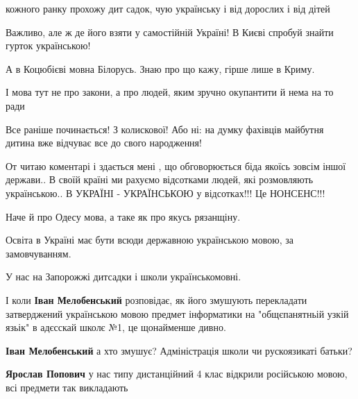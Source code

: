 \begin{itemize}
кожного ранку прохожу дит садок, чую українську і від дорослих і від дітей


Важливо, але ж де його взяти у самостійній Україні! В Києві спробуй знайти
гурток українською!

А в Коцюбієві мовна Білорусь. Знаю про що кажу, гірше лише в Криму.

І мова тут не про закони, а про людей, яким зручно окупантити й нема на то ради

Все раніше починається! З колискової! Або ні: на думку фахівців майбутня дитина
вже відчуває все до свого народження!


От читаю коментарі і здається мені , що обговорюється біда якоїсь зовсім іншої
держави.. В своїй країні ми рахуємо відсотками людей, які розмовляють
українською.. В УКРАЇНІ - УКРАЇНСЬКОЮ у відсотках!!! Це НОНСЕНС!!!


Наче й про Одесу мова, а таке як про якусь рязанщіну.

Освіта в Україні має бути всюди державною українською мовою, за замовчуванням.

У нас на Запорожжі дитсадки і школи українськомовні.

І коли \textbf{Іван Мелобенський} розповідає, як його змушують перекладати
затверджений українською мовою предмет інформатики на "общєпанятньій узкій
язьік" в адєсскай школє №1, це щонайменше дивно.

\begin{itemize} %
\textbf{Іван Мелобенський} а хто змушує? Адміністрація школи чи рускоязикаті батьки?

\textbf{Ярослав Попович} у нас типу дистанційний 4 клас відкрили російською мовою, всі предмети так викладають
\end{itemize} %

\end{itemize} %

